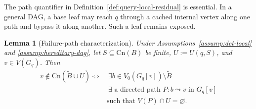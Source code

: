 \documentclass[journal]{IEEEtran}
\newcommand{\Cn}{\text{Cn}}
\newtheorem{lemma}{Lemma}[section]
\numberwithin{equation}{section}
\begin{document}
The path quantifier in Definition~\ref{def:query-local-residual} is
essential.  In a general DAG, a base leaf may reach \(q\) through a cached
internal vertex along one path and bypass it along another.  Such a leaf
remains exposed.

\begin{lemma}[Failure-path characterization]
\label{lem:failure-path}
Under Assumptions~\ref{assump:det-local} and
\ref{assump:hereditary-dag}, let \(S\subseteq\Cn(B)\) be finite,
\(U:=U(q,S)\), and \(v\in V(G_q)\).  Then
\begin{align}
  v\notin\Cn(\widetilde B\cup U)
  \Longleftrightarrow
  &\ \exists b\in V_0(G_q[v])\setminus\widetilde B
  \nonumber\\[-1mm]
  &\ \exists\text{ a directed path \(P:b\leadsto v\) in \(G_q[v]\)}
  \nonumber\\[-1mm]
  &\text{such that }V(P)\cap U=\varnothing.
\label{eq:failure-path}
\end{align}
\end{lemma}
\end{document}
